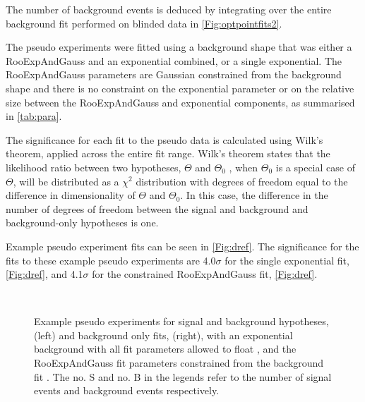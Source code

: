 The number of background events is deduced by integrating over the entire background fit performed on blinded \Lbpi data in \autoref{Fig:optpointfits2}\protect{}.


The pseudo experiments were fitted using a background shape that was either a RooExpAndGauss and an exponential combined, or a single exponential. The RooExpAndGauss parameters are Gaussian constrained from the \LbK background shape and there is no constraint on the exponential parameter or on the relative size between the RooExpAndGauss and exponential components, as summarised in \autoref{tab:para}. %
     

The significance for each fit to the pseudo  data is calculated using Wilk's theorem, applied across the entire fit range. Wilk's theorem states that the likelihood ratio between two hypotheses, $\Theta$ and $\Theta_{0}$ , when $\Theta_{0}$ is a special case of $\Theta$, will be distributed as a $\chi^{2}$ distribution with degrees of freedom equal to the difference in dimensionality of $\Theta$ and $\Theta_{0}$. In this case, the difference in the number of degrees of freedom between the signal and background and background-only hypotheses is one.  

Example pseudo experiment fits can be seen in \autoref{Fig:dref}. The significance for the fits to these example pseudo experiments are 4.0$\sigma$ for the single exponential fit, \autoref{Fig:dref}\protect{}, and 4.1$\sigma$ for the constrained RooExpAndGauss fit, \autoref{Fig:dref}\protect{}.


\begin{figure}[h!]
  \def\nh{0.7\textwidth}
  \centering
   \\
  \textwidth
  
  \caption{Example pseudo experiments for signal and background hypotheses, (left) and background only fits, (right), with an exponential background with all fit parameters allowed to float  \protect{}, and the RooExpAndGauss fit parameters constrained from the \LbK background fit \protect{}. The no. S and no. B in the legends refer to the number of signal events and background events respectively.}
\label{Fig:dref}
\end{figure}

